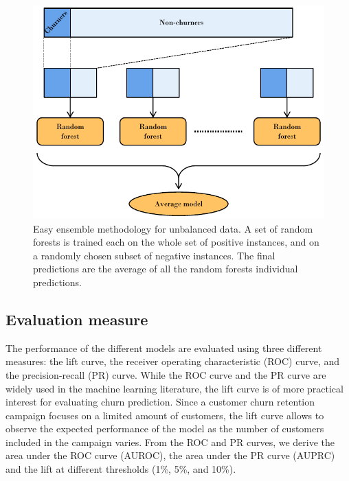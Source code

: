 \begin{figure}
    \centering
	\includegraphics[width=0.9\linewidth]{figures/easy_ensemble_diagram.pdf}
	\caption{Easy ensemble methodology for unbalanced data. A set of random
	forests is trained each on the whole set of positive instances, and on a
	randomly chosen subset of negative instances. The final predictions are
	the average of all the random forests individual predictions.}
	\label{fig:easy_ensemble_diagram}
\end{figure}

\subsection{Evaluation measure}

The performance of the different models are evaluated using three different
measures: the lift curve, the receiver operating characteristic (ROC) curve, and
the precision-recall (PR) curve. While the ROC curve and the PR curve are widely
used in the machine learning literature, the lift curve is of more practical
interest for evaluating churn prediction. Since a customer churn retention
campaign focuses on a limited amount of customers, the lift curve allows to
observe the expected performance of the model as the number of customers
included in the campaign varies. From the ROC and PR curves, we derive the area
under the ROC curve (AUROC), the area under the PR curve (AUPRC) and the lift at
different thresholds (1\%, 5\%, and 10\%).

